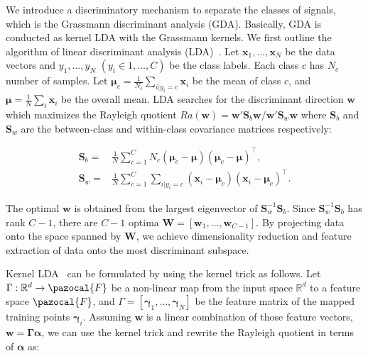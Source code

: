We introduce a discriminatory mechanism to separate the classes of signals, which is the Grassmann discriminant analysis (GDA).
Basically, GDA is conducted as kernel LDA with the Grassmann kernels. 
We first outline the algorithm of linear discriminant analysis (LDA)~\cite{fukunaga1990statistical}.
Let ${\bm{x}_{1}, \ldots, \bm{x}_{N}}$ be the data vectors and ${y_{1}, \ldots, y_{N}}$ $(y_{i} \in {1, \ldots, C})$ be the class labels. 
Each class $c$ has $N_{c}$ number of samples.
Let $\bm{\mu}_{c} = \frac{1}{N_{c}}\sum_{i|y_{i} = c} \bm{x}_{i}$ be the mean of class $c$, and $\bm{\mu} = \frac{1}{N} \sum_{i} \bm{x}_{i}$ be the overall mean. LDA searches for the discriminant direction $\bm{w}$ which maximizes the Rayleigh quotient 
$Ra(\bm{w}) = \bm{w}'\bm{S}_{b}\bm{w}/\bm{w}'\bm{S}_{w}\bm{w}$ where $\bm{S}_{b}$ and $\bm{S}_{w}$ are the between-class and within-class covariance matrices respectively:

\begin{align}
\bm{S}_{b} =& \frac{1}{N} \sum_{c=1}^{C} N_{c}(\bm{\mu}_{c} - \bm{\mu})(\bm{\mu}_{c} - \bm{\mu})^{\top},\\
\bm{S}_{w} =& \frac{1}{N} \sum_{c=1}^{C} \sum_{i|y_{i} = c} (\bm{x}_{i} - \bm{\mu}_{c})(\bm{x}_{i} - \bm{\mu}_{c})^{\top}.
\end{align}

The optimal $\bm{w}$ is obtained from the largest eigenvector
of $\bm{S}_{w}^{-1}\bm{S}_{b}$. Since $\bm{S}_{w}^{-1}\bm{S}_{b}$ has rank $C - 1$, there are $C - 1$ optima $\bm{W} = [ \bm{w}_{1}, \ldots, \bm{w}_{C-1} ]$.
By projecting data onto the space spanned by $\bm{W}$, we
achieve dimensionality reduction and feature extraction
of data onto the most discriminant subspace.

Kernel LDA~\cite{scholkopft1999fisher,baudat2000generalized,li2001constructing} can be formulated by using the kernel trick as follows. Let $\Gamma: \mathbb{R}^ {d} \rightarrow \pazocal{F}$ be a non-linear map from the input space $\mathbb{R}^ {d}$ to a feature space $\pazocal{F}$,
and $\Gamma = [\bm{\gamma}_{1},\ldots,\bm{\gamma}_{N}]$ be the feature matrix of the mapped training points $\bm{\gamma}_{i}$. Assuming $\bm{w}$ is a linear combination of those feature vectors, $\bm{w} = \bm{\Gamma}\bm{\alpha}$, we can use the kernel trick and rewrite the Rayleigh quotient in terms of $\bm{\alpha}$ as:

